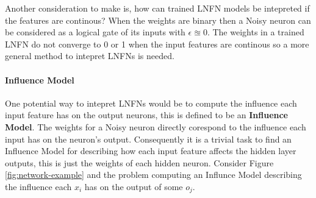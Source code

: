 Another consideration to make is, how can trained LNFN models be intepreted if the features are continous? When the weights are binary then a Noisy neuron can be considered as a logical gate of its inputs with $\epsilon \approxeq 0$. The weights in a trained LNFN do not converge to 0 or 1 when the input features are continous so a more general method to intepret LNFNs is needed.

\paragraph{Influence Model}
One potential way to intepret LNFNs would be to compute the influence each input feature has on the output neurons, this is defined to be an \textbf{Influence Model}.  The weights for a Noisy neuron directly corespond to the influence each input has on the neuron's output. Consequently it is a trivial task to find an Influence Model for describing how each input feature affects the hidden layer outputs, this is just the weights of each hidden neuron. Consider Figure \ref{fig:network-example}  and the problem computing an Influnce Model describing the influence each $x_i$ has on the output of some $o_j$.

